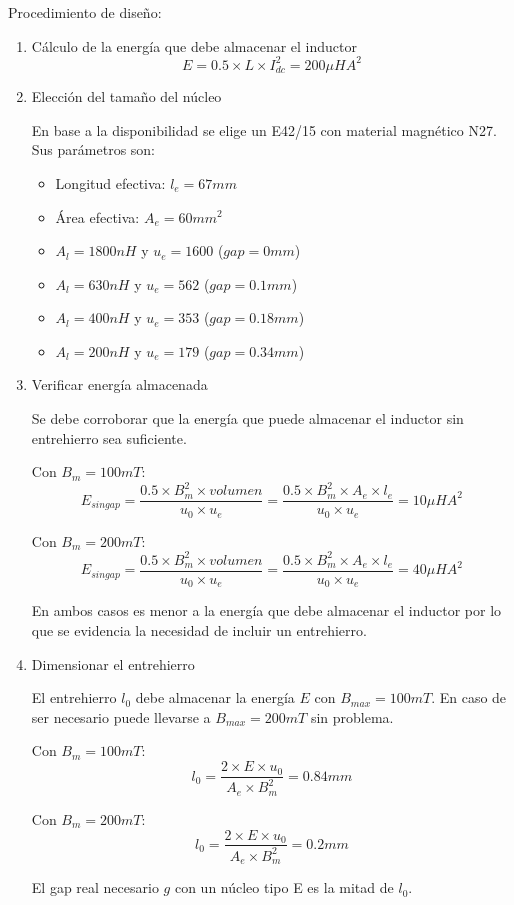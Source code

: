 Procedimiento de diseño:

\begin{enumerate}
\item{Cálculo de la energía que debe almacenar el inductor}
$$ E=0.5\times L\times I_{dc}^2=200\mu HA^2 $$
\item{Elección del tamaño del núcleo}

En base a la disponibilidad se elige un E42/15 con material magnético N27. 
Sus parámetros son:

\begin{itemize}
    \item Longitud efectiva: $l_e=67mm$
    \item Área efectiva: $A_e=60{mm}^2$
    \item $A_l=1800nH$ y $u_e=1600$ ($gap=0mm$)
    \item $A_l=630nH$ y $u_e=562$ ($gap=0.1mm$)
    \item $A_l=400nH$ y $u_e=353$ ($gap=0.18mm$)
    \item $A_l=200nH$ y $u_e=179$ ($gap=0.34mm$)
\end{itemize}

\item{Verificar energía almacenada}

Se debe corroborar que la energía que puede almacenar el inductor sin entrehierro sea suficiente.

Con $B_m=100mT$:
$$ E_{singap}=\frac{0.5\times B_m^2\times {volumen}}{u_0\times u_e}=\frac{0.5\times B_m^2\times A_e\times l_e}{u_0\times u_e}=10\mu HA^2 $$

Con $B_m=200mT$:
$$ E_{singap}=\frac{0.5\times B_m^2\times {volumen}}{u_0\times u_e}=\frac{0.5\times B_m^2\times A_e\times l_e}{u_0\times u_e}=40\mu HA^2 $$

En ambos casos es menor a la energía que debe almacenar el inductor por lo que se evidencia la necesidad de incluir un entrehierro. 

\item{Dimensionar el entrehierro}

El entrehierro $l_0$ debe almacenar la energía $E$ con $B_{max}=100mT$.
En caso de ser necesario puede llevarse a $B_{max}=200mT$ sin problema. 

Con $B_m=100mT$:
$$ l_0=\frac{2\times E\times u_0}{A_e\times B_m^2}=0.84mm $$

Con $B_m=200mT$:
$$ l_0=\frac{2\times E\times u_0}{A_e\times B_m^2}=0.2mm $$

El gap real necesario $g$ con un núcleo tipo E es la mitad de $l_0$.


\end{enumerate}
